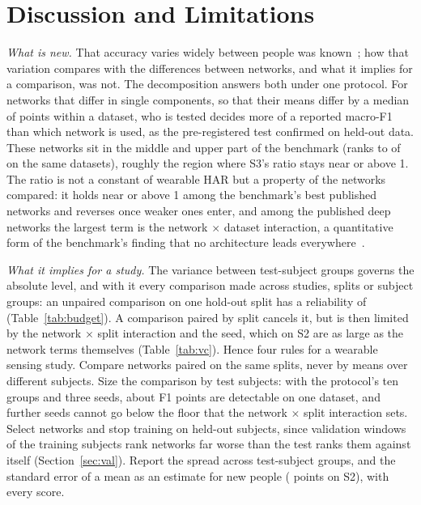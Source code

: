 \documentclass{IEEE_lsens}
\begin{document}
\clearpage  %
\raggedbottom  %
\section{Discussion and Limitations}
\emph{What is new.} That accuracy varies widely between people was known~\cite{barshan2016investigating,jordao2018human};
how that variation compares with the differences between networks, and what it implies for a comparison, was not.
The decomposition answers both under one protocol. For networks that differ in single components, so that their
means differ by a median of  points within a dataset, who is tested decides more of
a reported macro-F1 than which network is used, as the pre-registered test confirmed on held-out data. These networks
sit in the middle and upper part of the benchmark (ranks  to  of
 on the same datasets), roughly the region where S3's ratio stays near or above 1. The ratio is not a
constant of wearable HAR but a property of the networks compared: it holds near or above 1 among the benchmark's
best published networks and reverses once weaker ones enter, and among the published deep networks the largest term is the network $\times$ dataset
interaction, a quantitative form of the benchmark's finding that no architecture leads everywhere~\cite{burzer2026arena}.

\emph{What it implies for a study.} The variance between test-subject groups governs the absolute level, and with it
every comparison made across studies, splits or subject groups: an unpaired comparison on one hold-out split has a
reliability of  (Table~\ref{tab:budget}). A comparison paired by split cancels it,
but is then limited by the network $\times$ split interaction and the seed, which on S2 are as large as the network
terms themselves (Table~\ref{tab:vc}). Hence four rules for a wearable sensing study. Compare networks paired on the
same splits, never by means over different subjects. Size the comparison by test subjects: with the protocol's ten
groups and three seeds, about  F1 points are detectable on one dataset,
and further seeds cannot go below the floor that the network $\times$ split interaction sets. Select networks and stop
training on held-out subjects, since validation windows of the training subjects rank networks far worse than the test
ranks them against itself (Section~\ref{sec:val}). Report the spread across test-subject groups, and the standard
error of a mean as an estimate for new people ( points on S2), with every score.
\end{document}

